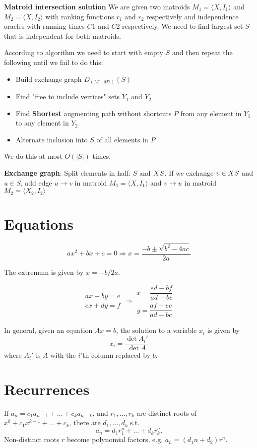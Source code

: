 \documentclass[a4paper]{article}
\begin{document}
\begin{landscape}
\begin{multicols}{2}
\begin{itemize}
\textbf{Matroid intersection solution}
We are given two matroids $M_1=⟨X,I_1⟩$ and $M_2=⟨X,I_2⟩$ with ranking functions $r_1$ and $r_2$ respectively and independence oracles with running times $C1$ and $C2$ respectively. We need to find largest set $S$ that is independent for both matroids.

According to algorithm we need to start with empty $S$ and then repeat the following until we fail to do this:

\begin{itemize}
    \item Build exchange graph $D_{(M1,M2)}(S)$
    \item Find "free to include vertices" sets $Y_1$ and $Y_2$
    \item Find \textbf{Shortest} augmenting path without shortcuts $P$ from any element in $Y_1$ to any element in $Y_2$
    \item Alternate inclusion into $S$ of all elements in $P$
\end{itemize}

We do this at most $O(|S|)$ times.

\textbf{Exchange graph}: Split elements in half: $S$ and $X \\ S$. If we exchange $v \in X \\ S$ and $u \in S$, add edge $u\rightarrow v$ in matroid $M_1=⟨X,I_1⟩$ and $v\rightarrow u$ in matroid $M_2=⟨X_2,I_2⟩$

\end{itemize}

\section{Equations}
\[ax^2+bx+c=0 \Rightarrow x = \frac{-b\pm\sqrt{b^2-4ac}}{2a}\]

The extremum is given by $x = -b/2a$.

\[\begin{aligned}ax+by=e\\cx+dy=f\end{aligned}
\Rightarrow
\begin{aligned}x=\dfrac{ed-bf}{ad-bc}\\y=\dfrac{af-ec}{ad-bc}\end{aligned}\]

In general, given an equation $Ax = b$, the solution to a variable $x_i$ is given by
\[x_i = \frac{\det A_i'}{\det A} \]
where $A_i'$ is $A$ with the $i$'th column replaced by $b$.

\section{Recurrences}
If $a_n = c_1 a_{n-1} + \dots + c_k a_{n-k}$, and $r_1, \dots, r_k$ are distinct roots of $x^k + c_1 x^{k-1} + \dots + c_k$, there are $d_1, \dots, d_k$ s.t.
\[a_n = d_1r_1^n + \dots + d_kr_k^n. \]
Non-distinct roots $r$ become polynomial factors, e.g. $a_n = (d_1n + d_2)r^n$.


\end{multicols}
\end{landscape}
\end{document}
